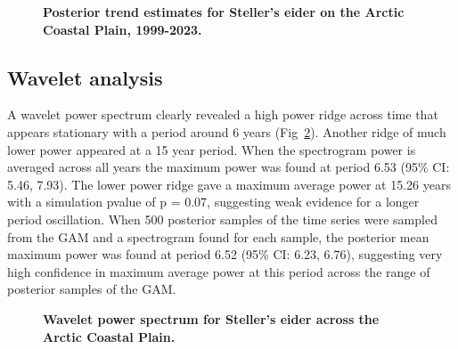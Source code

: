 \documentclass[
  10pt,
  letterpaper,
]{article}
\begin{document}
\begin{figure}

\caption{\label{fig-trendComb}\textbf{Posterior trend estimates for Steller's
eider on the Arctic Coastal Plain, 1999-2023.} }

\end{figure}%

\subsection{Wavelet analysis}\label{wavelet-analysis-1}

A wavelet power spectrum clearly revealed a high power ridge across
time that appears stationary with a period around 6 years
(Fig~\ref{fig-wavelet}). Another ridge of much lower power appeared at a
15 year period. When the spectrogram power is averaged across all years
the maximum power was found at period 6.53 (95\% CI: 5.46, 7.93). The
lower power ridge gave a maximum average power at 15.26 years with a
simulation pvalue of p = 0.07, suggesting weak evidence for a
longer period oscillation. When 500 posterior samples of the time series
were sampled from the GAM and a spectrogram found for each sample, the
posterior mean maximum power was found at period 6.52 (95\% CI: 6.23, 6.76), suggesting very high confidence in maximum average power at this period across the range of posterior samples of the GAM.

\begin{figure}

\caption{\label{fig-wavelet}\textbf{Wavelet power spectrum for Steller's eider across the Arctic Coastal Plain.} }

\end{figure}%
\end{document}
